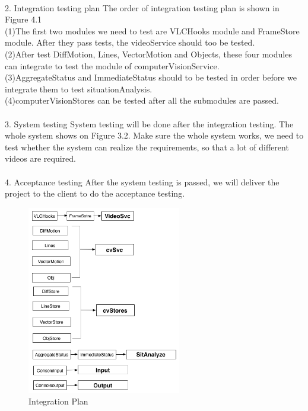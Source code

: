 \documentclass[11pt]{report}
\begin{document}
\\
2. Integration testing plan
The order of integration testing plan is shown in Figure 4.1\\
(1)The first two modules we need to test are VLCHooks module and FrameStore module. After they pass tests, the videoService should too be tested.\\
(2)After test DiffMotion, Lines, VectorMotion and Objects, these four modules can integrate to test the module of computerVisionService.\\
(3)AggregateStatus and ImmediateStatus should to be tested in order before we integrate them to test situationAnalysis.\\
(4)computerVisionStores can be tested after all the submodules are passed.\\
\\
3. System testing
System testing will be done after the integration testing. The whole system shows on Figure 3.2. Make sure the whole system works, we need to test whether the system can realize the requirements, so that a lot of different videos are required.\\
\\
4. Acceptance testing
After the system testing is passed, we will deliver the project to the client to do the acceptance testing. 

\begin{figure}[htb]
\centering
\includegraphics[width=0.6\textwidth]{integration.png}
\caption{ \small{Integration Plan}}
\end{figure}
\end{document}
